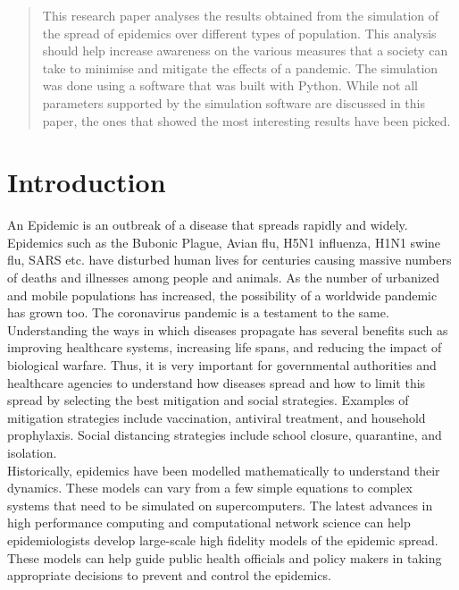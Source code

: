 \documentclass[conference]{IEEEtran}
\begin{document}
    \begin{abstract}
        This research paper analyses the results obtained from the simulation of the spread of epidemics over different types of population. This analysis should help increase awareness on the various measures that a society can take to minimise and mitigate the effects of a pandemic. The simulation was done using a software that was built with Python. While not all parameters supported by the simulation software are discussed in this paper, the ones that showed the most interesting results have been picked.
    \end{abstract}

    \section{Introduction}
    An Epidemic is an outbreak of a disease that spreads rapidly and widely. Epidemics such as the Bubonic Plague, Avian flu, H5N1 influenza, H1N1 swine flu, SARS etc. have disturbed human lives for centuries causing massive numbers of deaths and illnesses among people and animals. As the number of urbanized and mobile populations has increased, the possibility of a worldwide pandemic has grown too. The coronavirus pandemic is a testament to the same.\\
    
    Understanding the ways in which diseases propagate has several benefits such as improving healthcare systems, increasing life spans, and reducing the impact of biological warfare. Thus, it is very important for governmental authorities and healthcare agencies to understand how diseases spread and how to limit this spread by selecting the best mitigation and social strategies. Examples of mitigation strategies include vaccination, antiviral treatment, and household prophylaxis. Social distancing strategies include school closure, quarantine, and isolation.\\
    
    Historically, epidemics have been modelled mathematically to understand their dynamics. These models can vary from a few simple equations to complex systems that need to be simulated on supercomputers. The latest advances in high performance computing and computational network science can help epidemiologists develop large-scale high fidelity models of the epidemic spread. These models can help guide public health officials and policy makers in taking appropriate decisions to prevent and control the epidemics.\\ 
    
\end{document}
